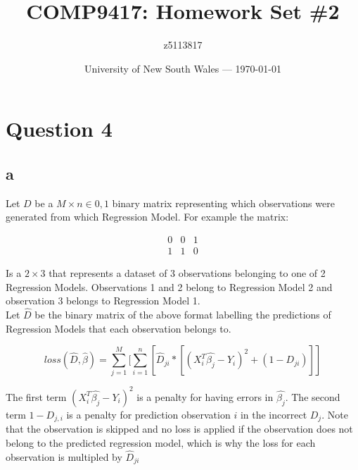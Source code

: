 \documentclass{article}
\title{COMP9417: Homework Set \#2} %
\author{z5113817} %
\date{University of New South Wales --- \today} %
\begin{document}




\section*{Question 4}

\subsection*{a}

Let \(D\) be a \(M \times n\in{0,1}\) binary matrix representing which observations were generated 
from which Regression Model. For example the matrix:

\[
    \begin{matrix}
        0 & 0 & 1\\
        1 & 1 & 0
    \end{matrix}
\]

Is a \(2 \times 3\) that represents a dataset of 3 observations belonging to one of 2 Regression Models. Observations
1 and 2 belong to Regression Model 2 and observation 3 belongs to Regression Model 1.\\

Let \(\hat{D}\) be the binary matrix of the above format labelling the predictions of Regression Models that each observation 
belongs to.


\[
    loss(\hat{D}, \hat{\beta}) = \sum_{j=1}^{M}[
        \sum_{i=1}^{n}[
            \hat{D}_{ji} * 
            [(X_{i}^{T} \hat{\beta_{j}} - Y_{i})^{2} + (1 - D_{ji})]
    ]
\]

The first term \((X_{i}^{T} \hat{\beta_{j}} - Y_{i})^{2}\) is a penalty for having errors in \(\hat{\beta_{j}}\). The second term
\(1 - D_{j,i}\) is a penalty for prediction observation \(i\) in the incorrect \(D_{j}\). Note that the observation is skipped and 
no loss is applied if the observation does not belong to the predicted regression model, which is why the loss for each 
observation is multipled by \(\hat{D}_{ji}\)\\
\end{document}
